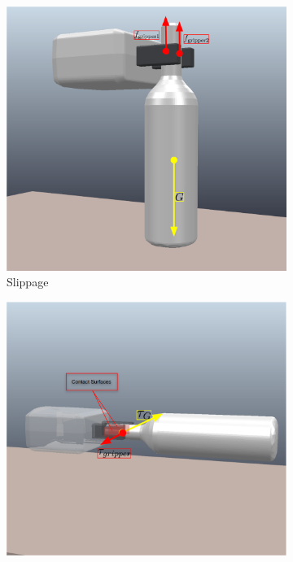 \documentclass[12pt]{ucsddissertation}
\begin{document}
\begin{figure}
	\centering
	\begin{subfigure}[b]{0.4\linewidth}
		\includegraphics[width=\linewidth]{figures/slippage.png}
		\caption{Slippage}\label{liftfiga}
	\end{subfigure}%
	\hfill
	\begin{subfigure}[b]{0.4165\linewidth}
		\includegraphics[width=\linewidth]{figures/rotational.png}

\end{subfigure}
\end{figure}
\end{document}
